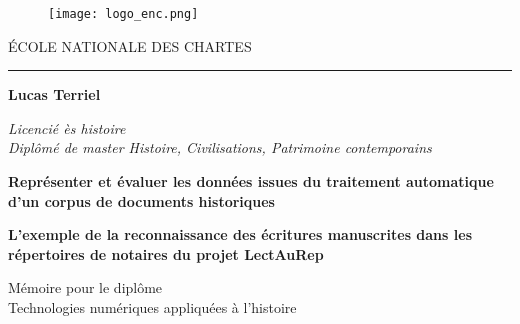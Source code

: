 \begin{titlepage}
    \begin{center}
    
\begin{figure}[h]
    \centering
    \centerline{\texttt{[image: logo\_enc.png]}}
\end{figure}

        \bigskip
    
        \begin{large}
            \'ECOLE NATIONALE DES CHARTES 
        \end{large}
    
        \begin{center}
            \rule{4cm}{0.02cm}
        \end{center}
    
        \hugeskip
        
        \begin{Large}
             \textbf{Lucas Terriel}\\
        \end{Large}
        \begin{normalsize}
            \textit{Licencié ès histoire}\\
            \textit{Diplômé de master 
            Histoire, Civilisations, Patrimoine contemporains}\\
        \end{normalsize}
        
        \hugeskip
        \bigskip
        
        \begin{LARGE}
            \textbf{Représenter et évaluer les données issues du traitement automatique d'un corpus de documents historiques}
            
        \end{LARGE}
        \bigskip
        \bigskip
        \bigskip
        \bigskip
        \begin{large}
            \textbf{L'exemple de la reconnaissance des écritures manuscrites dans les répertoires de notaires du projet LectAuRep}\\
        \end{large}
        
        \hugeskip
        \vfill
        
        
        
        \begin{large}
            Mémoire pour le diplôme\\
            \og Technologies numériques appliquées à l'histoire \fg\\
        \end{large}
        

\end{center}
\end{titlepage}
